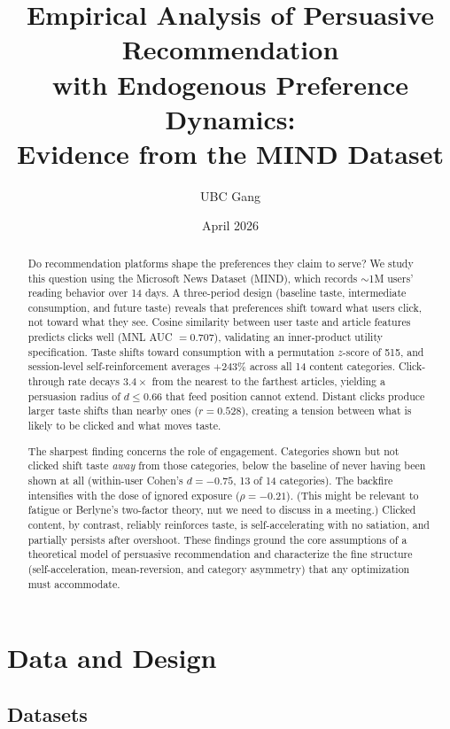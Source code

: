 \documentclass[11pt]{article}
\title{Empirical Analysis of Persuasive Recommendation\\with Endogenous Preference Dynamics:\\[4pt] Evidence from the MIND Dataset}
\author{UBC Gang}
\date{April 2026}
\begin{document}
\maketitle

\begin{abstract}
Do recommendation platforms shape the preferences they claim to serve? We study this question using the Microsoft News Dataset (MIND), which records ${\sim}$1M users' reading behavior over 14 days. A three-period design (baseline taste, intermediate consumption, and future taste) reveals that preferences shift toward what users click, not toward what they see. Cosine similarity between user taste and article features predicts clicks well (MNL AUC $= 0.707$), validating an inner-product utility specification. Taste shifts toward consumption with a permutation $z$-score of 515, and session-level self-reinforcement averages $+243\%$ across all 14 content categories. Click-through rate decays $3.4\times$ from the nearest to the farthest articles, yielding a persuasion radius of $d \leq 0.66$ that feed position cannot extend. Distant clicks produce larger taste shifts than nearby ones ($r = 0.528$), creating a tension between what is likely to be clicked and what moves taste.

The sharpest finding concerns the role of engagement. Categories shown but not clicked shift taste \emph{away} from those categories, below the baseline of never having been shown at all (within-user Cohen's $d = -0.75$, 13 of 14 categories). The backfire intensifies with the dose of ignored exposure ($\rho = -0.21$). (This might be relevant to fatigue or Berlyne’s two-factor theory, nut we need to discuss in a meeting.) Clicked content, by contrast, reliably reinforces taste, is self-accelerating with no satiation, and partially persists after overshoot. These findings ground the core assumptions of a theoretical model of persuasive recommendation and characterize the fine structure (self-acceleration, mean-reversion, and category asymmetry) that any optimization must accommodate.
\end{abstract}


\section{Data and Design}

\subsection{Datasets}
\end{document}
